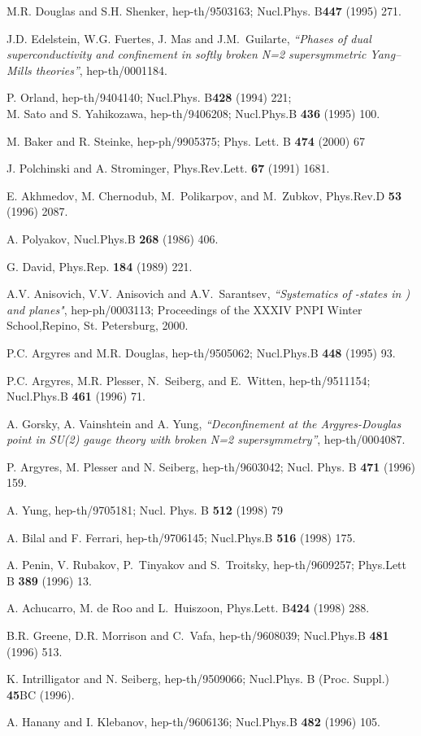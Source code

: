 \documentclass[a4paper,12pt]{article}
\begin{document}
\begin{thebibliography}{99}
 M.R. Douglas and S.H. Shenker, hep-th/9503163;
Nucl.Phys. B{\bf447} (1995) 271.

J.D. Edelstein, W.G. Fuertes, J. Mas and
J.M.~Guilarte, {\em ``Phases of dual superconductivity and
confinement in softly broken {\cal N}=2 supersymmetric Yang--Mills
theories''}, hep-th/0001184.


 P. Orland, hep-th/9404140; Nucl.Phys. B{\bf428}
(1994) 221;\\ M. Sato and S. Yahikozawa, hep-th/9406208;
Nucl.Phys.B {\bf436} (1995) 100.


M. Baker and R. Steinke, hep-ph/9905375;
Phys. Lett. B {\bf474} (2000) 67


J. Polchinski and A. Strominger, Phys.Rev.Lett.
{\bf67} (1991) 1681.

E. Akhmedov, M. Chernodub, M.~Polikarpov, and
M.~Zubkov, Phys.Rev.D {\bf53} (1996) 2087.

A. Polyakov, Nucl.Phys.B {\bf268} (1986) 406.

G. David, Phys.Rep. {\bf184} (1989) 221.

 A.V. Anisovich, V.V. Anisovich
 and A.V.~Sarantsev, {\em ``Systematics of \coordHE{}-states in \coordHE{}) and \coordHE{} planes"},
hep-ph/0003113; Proceedings of
the XXXIV PNPI Winter School,Repino, St. Petersburg, 2000.

P.C. Argyres and M.R. Douglas, hep-th/9505062;
Nucl.Phys.B {\bf448} (1995) 93.

P.C. Argyres, M.R. Plesser, N.~Seiberg, and
E.~Witten, hep-th/9511154; Nucl.Phys.B {\bf461} (1996) 71.

 A. Gorsky, A. Vainshtein and A. Yung, {\em
``Deconfinement at the Argyres-Douglas point in SU(2) gauge theory
with broken {\cal N}=2 supersymmetry''}, hep-th/0004087.

 P. Argyres, M. Plesser and N. Seiberg, hep-th/9603042;
Nucl. Phys. B {\bf471} (1996) 159.

 A. Yung, hep-th/9705181; Nucl. Phys. B {\bf512} (1998) 79

 A. Bilal and F. Ferrari, hep-th/9706145;
Nucl.Phys.B {\bf516} (1998) 175.

A. Penin, V. Rubakov, P.~Tinyakov and S.~Troitsky,
hep-th/9609257; Phys.Lett B {\bf389} (1996) 13.

 A. Achucarro, M. de Roo and L.~Huiszoon,
Phys.Lett. B{\bf424} (1998) 288.

 B.R. Greene, D.R. Morrison and C.~Vafa,
hep-th/9608039; Nucl.Phys.B {\bf481} (1996) 513.

 K. Intrilligator and N. Seiberg, hep-th/9509066;
Nucl.Phys. B (Proc. Suppl.) {\bf45}BC (1996).

A. Hanany and I. Klebanov, hep-th/9606136;
Nucl.Phys.B {\bf482} (1996) 105.




\end{thebibliography}
\end{document}
